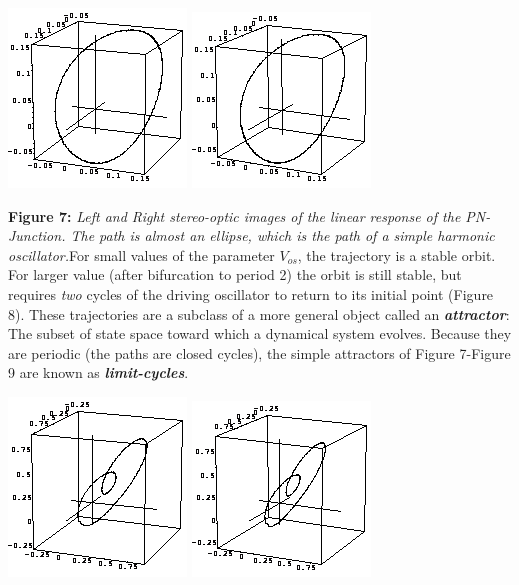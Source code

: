 \documentclass{../lab}
\begin{document}
\noindent
\href{http://experimentationlab.berkeley.edu/sites/default/files/images/Nldimage042.gif}{\includegraphics[width=0.33\linewidth,keepaspectratio]{images/Nldimage042.png}}
\href{http://experimentationlab.berkeley.edu/sites/default/files/images/Nldimage043.gif}{\includegraphics[width=0.33\linewidth,keepaspectratio]{images/Nldimage043.png}}

\textbf{Figure 7:} \emph{Left and Right stereo-optic images of the linear response of the PN-Junction. The path is almost an ellipse, which is the path of a simple harmonic oscillator.}For small values of the parameter $V_{os}$, the trajectory is a stable orbit. For larger value (after bifurcation to period 2) the orbit is still stable, but requires \emph{two} cycles of the driving oscillator to return to its initial point (Figure 8). These trajectories are a subclass of a more general object called an \emph{\textbf{attractor}}: The subset of state space toward which a dynamical system evolves. Because they are periodic (the paths are closed cycles), the simple attractors of Figure 7-Figure 9 are known as \emph{\textbf{limit-cycles}}.

\noindent
\href{http://experimentationlab.berkeley.edu/sites/default/files/images/Nldimage044.gif}{\includegraphics[width=0.33\linewidth,keepaspectratio]{images/Nldimage044.png}}
\href{http://experimentationlab.berkeley.edu/sites/default/files/images/Nldimage045.gif}{\includegraphics[width=0.33\linewidth,keepaspectratio]{images/Nldimage045.png}}
\end{document}
